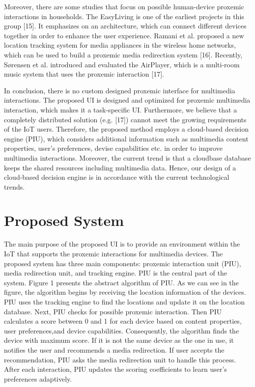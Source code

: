 \documentclass[runningheads,a4paper]{llncs}
\begin{document}
Moreover, there are some studies that focus on possible human-device proxemic interactions in households. The EasyLiving is one of the earliest projects
in this group [15]. It emphasizes on an architecture, which can connect different
devices together in order to enhance the user experience. Ramani et al. proposed
a new location tracking system for media appliances in the wireless home networks, which can be used to build a proxemic media redirection system [16].
Recently, Sørensen et al. introduced and evaluated the AirPlayer, which is a
multi-room music system that uses the proxemic interaction [17].



In conclusion, there is no custom designed proxemic interface for multimedia
interactions. The proposed UI is designed and optimized for proxemic multimedia interaction, which makes it a task-specific UI. Furthermore, we believe that
a completely distributed solution (e.g. [17]) cannot meet the growing requirements of the IoT users. Therefore, the proposed method employs a cloud-based
decision engine (PIU), which considers additional information such as multimedia content properties, user’s preferences, devise capabilities etc. in order to
improve multimedia interactions. Moreover, the current trend is that a cloudbase database keeps the shared resources including multimedia data. Hence, our
design of a cloud-based decision engine is in accordance with the current technological trends.

\section{Proposed System}
The main purpose of the proposed UI is to provide an environment within the
IoT that supports the proxemic interactions for multimedia devices. The proposed system has three main components: proxemic interaction unit (PIU), media redirection unit, and tracking engine. PIU is the central part of the system.
Figure 1 presents the abstract algorithm of PIU. As we can see in the figure, the
algorithm begins by receiving the location information of the devices. PIU uses
the tracking engine to find the locations and update it on the location database.
Next, PIU checks for possible proxemic interaction. Then PIU calculates a score
between 0 and 1 for each device based on content properties, user preferences,and device capabilities. Consequently, the algorithm finds the device with maximum score. If it is not the same device as the one in use, it notifies the user and
recommends a media redirection. If user accepts the recommendation, PIU asks
the media redirection unit to handle this process. After each interaction, PIU
updates the scoring coefficients to learn user’s preferences adaptively.
\end{document}
